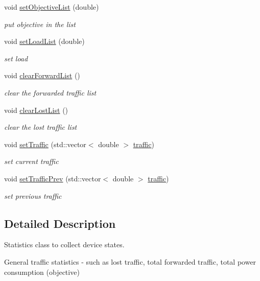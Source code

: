 \begin{DoxyCompactItemize}
void \hyperlink{classstatistics_a625258dee0b4eaf0fa5ade3643a4535e}{set\-Objective\-List} (double)
\begin{DoxyCompactList}\small\item\em put objective in the list \end{DoxyCompactList}\item 
void \hyperlink{classstatistics_af1594f7585e2c0776ef2f8fb7ddd3fca}{set\-Load\-List} (double)
\begin{DoxyCompactList}\small\item\em set load \end{DoxyCompactList}\item 
void \hyperlink{classstatistics_aa371004886cf08d7632027c575d983fc}{clear\-Forward\-List} ()
\begin{DoxyCompactList}\small\item\em clear the forwarded traffic list \end{DoxyCompactList}\item 
void \hyperlink{classstatistics_a897546605e8b6c2b2ec411092e89dab8}{clear\-Lost\-List} ()
\begin{DoxyCompactList}\small\item\em clear the lost traffic list \end{DoxyCompactList}\item 
void \hyperlink{classstatistics_a8eac6ae2c2c67ba31213549822c4ce32}{set\-Traffic} (std\-::vector$<$ double $>$ \hyperlink{parser_8cpp_a49482e053b5a87760f4c3fe1242cd72b}{traffic})
\begin{DoxyCompactList}\small\item\em set current traffic \end{DoxyCompactList}\item 
void \hyperlink{classstatistics_a6d9d539aa95a348aff20fd022b9a35b0}{set\-Traffic\-Prev} (std\-::vector$<$ double $>$ \hyperlink{parser_8cpp_a49482e053b5a87760f4c3fe1242cd72b}{traffic})
\begin{DoxyCompactList}\small\item\em set previous traffic \end{DoxyCompactList}\end{DoxyCompactItemize}


\subsection{\-Detailed \-Description}
\-Statistics class to collect device states. 

\-General traffic statistics -\/ such as lost traffic, total forwarded traffic, total power consumption (objective) 

